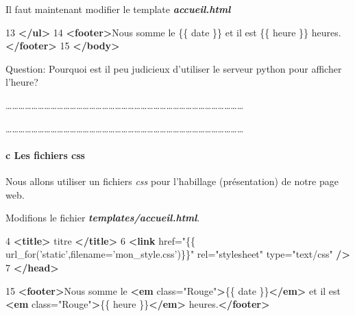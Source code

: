 \documentclass{article}
\newenvironment{Shaded}{}{}
\newcommand{\KeywordTok}[1]{\textcolor[rgb]{0.00,0.44,0.13}{\textbf{{#1}}}}
\newcommand{\StringTok}[1]{\textcolor[rgb]{0.25,0.44,0.63}{{#1}}}
\newcommand{\OtherTok}[1]{\textcolor[rgb]{0.00,0.44,0.13}{{#1}}}
\newcommand{\NormalTok}[1]{{#1}}
\begin{document}
Il faut maintenant modifier le template \textbf{\emph{accueil.html}}

\begin{Shaded}
\begin{Highlighting}[]
\NormalTok{13     }\KeywordTok{</ul>}
\NormalTok{14    }\KeywordTok{<footer>}\NormalTok{Nous somme le \{\{ date \}\} et il est \{\{ heure \}\} heures.}\KeywordTok{</footer>}
\NormalTok{15     }\KeywordTok{</body>}
\end{Highlighting}
\end{Shaded}

Question: Pourquoi est il peu judicieux d'utiliser le serveur python
pour afficher l'heure?

\ldots{}\ldots{}\ldots{}\ldots{}\ldots{}\ldots{}\ldots{}\ldots{}\ldots{}\ldots{}\ldots{}\ldots{}\ldots{}\ldots{}\ldots{}\ldots{}\ldots{}\ldots{}\ldots{}\ldots{}\ldots{}\ldots{}\ldots{}\ldots{}\ldots{}\ldots{}\ldots{}\ldots{}\ldots{}\ldots{}\ldots{}\ldots{}\ldots{}\ldots{}\ldots{}\ldots{}\ldots{}

\ldots{}\ldots{}\ldots{}\ldots{}\ldots{}\ldots{}\ldots{}\ldots{}\ldots{}\ldots{}\ldots{}\ldots{}\ldots{}\ldots{}\ldots{}\ldots{}\ldots{}\ldots{}\ldots{}\ldots{}\ldots{}\ldots{}\ldots{}\ldots{}\ldots{}\ldots{}\ldots{}\ldots{}\ldots{}\ldots{}\ldots{}\ldots{}\ldots{}\ldots{}\ldots{}\ldots{}\ldots{}

\paragraph{c Les fichiers css}\label{c-les-fichiers-css}

Nous allons utiliser un fichiers \emph{css} pour l'habillage
(présentation) de notre page web.

Modifions le fichier \textbf{\emph{templates/accueil.html}}.

\begin{Shaded}
\begin{Highlighting}[]
\NormalTok{4 }\KeywordTok{<title>} \NormalTok{titre }\KeywordTok{</title>}
\NormalTok{6 }\KeywordTok{<link}\OtherTok{ href=}\StringTok{"\{\{ url_for('static',filename='mon_style.css')\}\}"}\OtherTok{ rel=}\StringTok{"stylesheet"}\OtherTok{ type=}\StringTok{"text/css"} \KeywordTok{/>}
\NormalTok{7 }\KeywordTok{</head>}
\end{Highlighting}
\end{Shaded}

\begin{Shaded}
\begin{Highlighting}[]
\NormalTok{15    }\KeywordTok{<footer>}\NormalTok{Nous somme le }\KeywordTok{<em}\OtherTok{ class=}\StringTok{"Rouge"}\KeywordTok{>}\NormalTok{\{\{ date \}\}}\KeywordTok{</em>} \NormalTok{et il est }\KeywordTok{<em}\OtherTok{ class=}\StringTok{"Rouge"}\KeywordTok{>}\NormalTok{\{\{ heure \}\}}\KeywordTok{</em>} \NormalTok{heures.}\KeywordTok{</footer>}
\end{Highlighting}
\end{Shaded}
\end{document}
